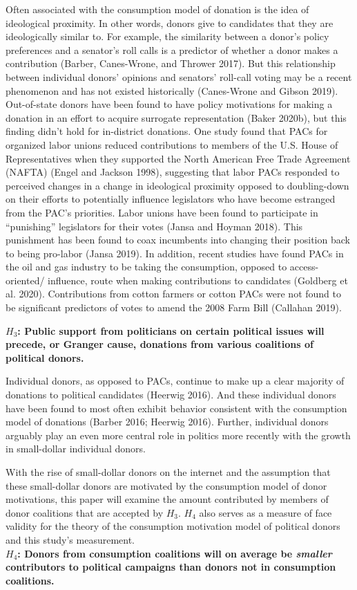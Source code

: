 \documentclass[12pt,]{article}
\begin{document}
Often associated with the consumption model of donation is the idea of
ideological proximity. In other words, donors give to candidates that
they are ideologically similar to. For example, the similarity between a
donor's policy preferences and a senator's roll calls is a predictor of
whether a donor makes a contribution (Barber, Canes-Wrone, and Thrower
2017). But this relationship between individual donors' opinions and
senators' roll-call voting may be a recent phenomenon and has not
existed historically (Canes-Wrone and Gibson 2019). Out-of-state donors
have been found to have policy motivations for making a donation in an
effort to acquire surrogate representation (Baker 2020b), but this
finding didn't hold for in-district donations. One study found that PACs
for organized labor unions reduced contributions to members of the U.S.
House of Representatives when they supported the North American Free
Trade Agreement (NAFTA) (Engel and Jackson 1998), suggesting that labor
PACs responded to perceived changes in a change in ideological proximity
opposed to doubling-down on their efforts to potentially influence
legislators who have become estranged from the PAC's priorities. Labor
unions have been found to participate in ``punishing'' legislators for
their votes (Jansa and Hoyman 2018). This punishment has been found to
coax incumbents into changing their position back to being pro-labor
(Jansa 2019). In addition, recent studies have found PACs in the oil and
gas industry to be taking the consumption, opposed to access-oriented/
influence, route when making contributions to candidates (Goldberg et
al. 2020). Contributions from cotton farmers or cotton PACs were not
found to be significant predictors of votes to amend the 2008 Farm Bill
(Callahan 2019).

\textbf{\(H_{3}\): Public support from politicians on certain political
issues will precede, or Granger cause, donations from various coalitions
of political donors.}

Individual donors, as opposed to PACs, continue to make up a clear
majority of donations to political candidates (Heerwig 2016). And these
individual donors have been found to most often exhibit behavior
consistent with the consumption model of donations (Barber 2016; Heerwig
2016). Further, individual donors arguably play an even more central
role in politics more recently with the growth in small-dollar
individual donors.

With the rise of small-dollar donors on the internet and the assumption
that these small-dollar donors are motivated by the consumption model of
donor motivations, this paper will examine the amount contributed by
members of donor coalitions that are accepted by \(H_{3}\). \(H_{4}\)
also serves as a measure of face validity for the theory of the
consumption motivation model of political donors and this study's
measurement.\\
\textbf{\(H_{4}\): Donors from consumption coalitions will on average be
\emph{smaller} contributors to political campaigns than donors not in
consumption coalitions.}
\end{document}
